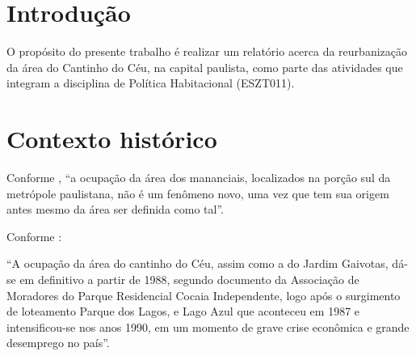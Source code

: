 	
	
	\tableofcontents 
	\newpage \listoffigures
	\newpage \listoftables
	\textual
	
	
	
	
	\chapter{Introdução}
	
	O propósito do presente trabalho é realizar um relatório acerca da reurbanização da área do Cantinho do Céu, na capital paulista, como parte das atividades que integram a disciplina de Política Habitacional (ESZT011).
	
	\chapter{Contexto histórico}
	
	Conforme , ``a ocupação da área dos mananciais, localizados na porção sul da metrópole paulistana, não é um fenômeno novo, uma vez que tem sua origem antes mesmo da área ser definida como tal''.
	
	Conforme :
	
	\begin{citacao}
		``A ocupação da área do cantinho do Céu, assim como a do Jardim Gaivotas, dá-se em definitivo a partir de 1988, segundo documento da Associação de Moradores do Parque Residencial Cocaia Independente, logo após o surgimento de loteamento Parque dos Lagos, e Lago Azul que aconteceu em 1987 e intensificou-se nos anos 1990, em um momento de grave crise econômica e grande desemprego no país''.
	\end{citacao}
	

